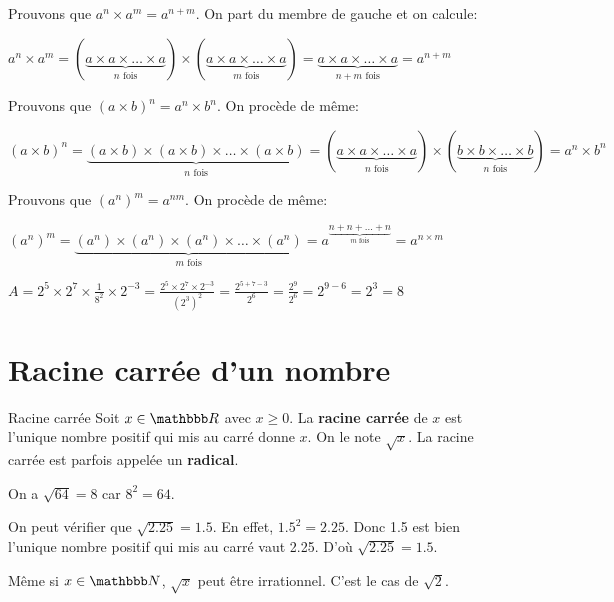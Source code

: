 \documentclass[10pt,a4paper,openany,twoside,prof]{book}
\begin{document}
\begin{dem}{}{}
	Prouvons que $a^n\times a^m = a^{n+m}$. On part du membre de gauche et on calcule:

	$a^n\times a^m = (\underbrace{a\times a\times \dots\times a}_{n \text{ fois}}) \times (\underbrace{a\times a\times \dots\times a}_{m \text{ fois}}) = \underbrace{a\times a\times \dots\times a}_{n+m \text{ fois}} = a^{n+m}$

	Prouvons que $(a\times b)^n = a^n \times b^n$. On procède de même:

	$(a\times b)^n = \underbrace{(a\times b)\times(a\times b)\times \dots \times(a\times b)}_{n \text{ fois}} =  (\underbrace{a\times a\times \dots\times a}_{n \text{ fois}}) \times (\underbrace{b\times b\times \dots\times b}_{n \text{ fois}}) = a^n \times b^n$

	Prouvons que $(a^n)^m = a^{nm}$. On procède de même:

	$(a^n)^m = \underbrace{(a^n)\times(a^n)\times(a^n)\times\dots\times(a^n)}_{m \text{ fois}}  = a^{\underbrace{n+n+\dots+n}_{m \text{ fois}}}= a^{n\times m}$


\end{dem}

\begin{ex}{}{}
	$A = 2^5\times2^7\times\frac{1}{8^2}\times 2^{-3} = \frac{2^5\times2^7\times2^{-3}}{(2^3)^2}  = \frac{2^{5+7-3}}{2^6} = \frac{2^9}{2^6} = 2^{9-6} = 2^3 = 8$
\end{ex}

\section{Racine carrée d'un nombre}
\begin{defi}{Racine carrée}{}
	Soit $x\in\R$ avec $x\ge 0$. La \textbf{racine carrée }de $x$ est l'unique nombre positif qui mis au carré donne $x$. On le note $\sqrt{x}$. La racine carrée est parfois appelée un \textbf{radical}.
\end{defi}

\begin{ex}{}{}
On a $\sqrt{64}=8$ car $8^2=64$.

On peut vérifier que $\sqrt{2.25} = 1.5$. En effet, $1.5^2 = 2.25$. Donc 1.5 est bien l'unique nombre positif qui mis au carré vaut 2.25. D'où $\sqrt{2.25} = 1.5$.
\end{ex}

\begin{rem}{}{}
	Même si $x\in\N$, $\sqrt{x}$ peut être irrationnel. C'est le cas de $\sqrt{2}$.
\end{rem}
\end{document}
